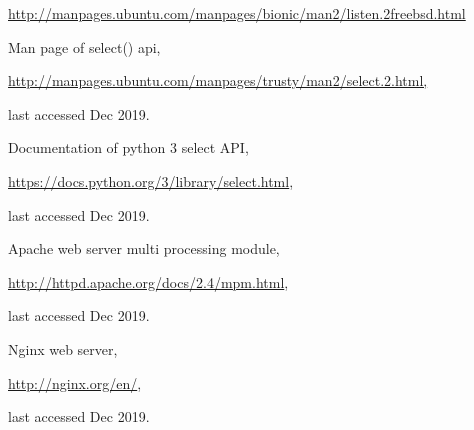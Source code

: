 \begin{multicols}{2}
\begin{thebibliography}{99}
\url{http://manpages.ubuntu.com/manpages/bionic/man2/listen.2freebsd.html}

 Man page of select() api,

\url{http://manpages.ubuntu.com/manpages/trusty/man2/select.2.html,}

last accessed Dec 2019.

 Documentation of python 3 select API, 

\url{https://docs.python.org/3/library/select.html}, 

last accessed Dec 2019.

 Apache web server multi processing module,

\url{http://httpd.apache.org/docs/2.4/mpm.html},

 last accessed Dec 2019.
 
 Nginx web server, 

\url{http://nginx.org/en/},

last accessed Dec 2019.

\end{thebibliography}
\end{multicols}


